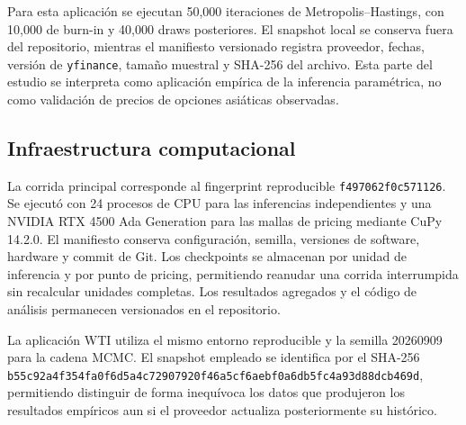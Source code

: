Para esta aplicación se ejecutan 50,000 iteraciones de Metropolis--Hastings, con 10,000 de burn-in y 40,000 draws posteriores. El snapshot local se conserva fuera del repositorio, mientras el manifiesto versionado registra proveedor, fechas, versión de \texttt{yfinance}, tamaño muestral y SHA-256 del archivo. Esta parte del estudio se interpreta como aplicación empírica de la inferencia paramétrica, no como validación de precios de opciones asiáticas observadas.

\subsection{Infraestructura computacional}

La corrida principal corresponde al fingerprint reproducible \texttt{f497062f0c571126}. Se ejecutó con 24 procesos de CPU para las inferencias independientes y una NVIDIA RTX 4500 Ada Generation para las mallas de pricing mediante CuPy 14.2.0. El manifiesto conserva configuración, semilla, versiones de software, hardware y commit de Git. Los checkpoints se almacenan por unidad de inferencia y por punto de pricing, permitiendo reanudar una corrida interrumpida sin recalcular unidades completas. Los resultados agregados y el código de análisis permanecen versionados en el repositorio.

La aplicación WTI utiliza el mismo entorno reproducible y la semilla 20260909 para la cadena MCMC. El snapshot empleado se identifica por el SHA-256 \texttt{b55c92a4f354fa0f6d5a4c72907920f46a5cf6aebf0a6db5fc4a93d88dcb469d}, permitiendo distinguir de forma inequívoca los datos que produjeron los resultados empíricos aun si el proveedor actualiza posteriormente su histórico.
